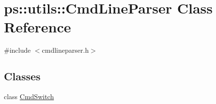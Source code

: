 \hypertarget{classps_1_1utils_1_1CmdLineParser}{}\section{ps\+:\+:utils\+:\+:Cmd\+Line\+Parser Class Reference}
\label{classps_1_1utils_1_1CmdLineParser}


{\ttfamily \#include $<$cmdlineparser.\+h$>$}

\subsection*{Classes}
\begin{DoxyCompactItemize}
\item 
class \hyperlink{classps_1_1utils_1_1CmdLineParser_1_1CmdSwitch}{Cmd\+Switch}
\end{DoxyCompactItemize}
